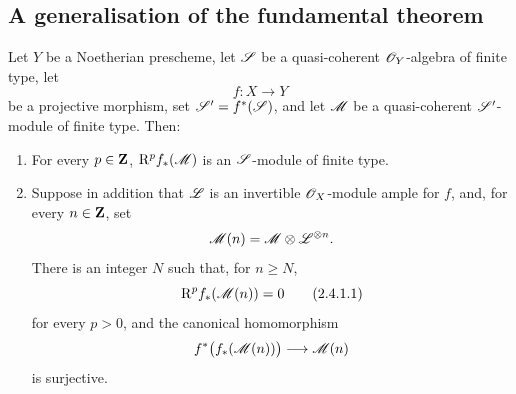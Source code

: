 \subsection{A generalisation of the fundamental theorem}
\label{subsection:III.2.4}

\begin{theorem}[2.4.1]
\label{III.2.4.1}
Let $Y$ be a Noetherian prescheme, let $\mathscr{S}$ be a quasi-coherent $\mathscr{O}_Y$-algebra of finite type, let
\[
  f:X\longrightarrow Y
\]
be a projective morphism, set $\mathscr{S}'=f^*(\mathscr{S})$, and let $\mathscr{M}$ be a quasi-coherent $\mathscr{S}'$-module of finite type.
Then:
\begin{enumerate}
  \item[(i)] For every $p\in\mathbf{Z}$, $\mathrm{R}^p f_*(\mathscr{M})$ is an $\mathscr{S}$-module of finite type.

  \item[(ii)] Suppose in addition that $\mathscr{L}$ is an invertible $\mathscr{O}_X$-module ample for $f$, and, for every $n\in\mathbf{Z}$, set
  \[
    \mathscr{M}(n)=\mathscr{M}\otimes\mathscr{L}^{\otimes n}.
  \]
  There is an integer $N$ such that, for $n\geq N$,
  \[
  \label{III.2.4.1.1}
    \mathrm{R}^p f_*(\mathscr{M}(n))=0
    \tag{2.4.1.1}
  \]
  for every $p>0$, and the canonical homomorphism
  \[
    f^*\bigl(f_*(\mathscr{M}(n))\bigr)\longrightarrow\mathscr{M}(n)
  \]
   is surjective.
\end{enumerate}
\end{theorem}

